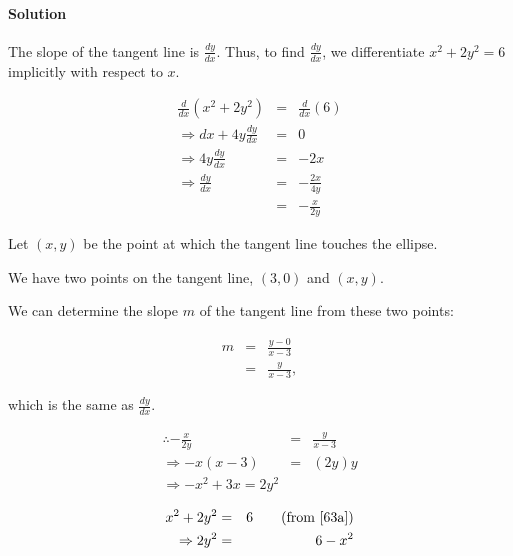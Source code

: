 

\paragraph{Solution} 

The slope of the tangent line is $\frac{dy}{dx}$. Thus, to find $\frac{dy}{dx}$, we differentiate $x^2+2y^2=6$ implicitly with respect to $x$.

\begin{eqnarray*}
	\frac{d}{dx}\left(x^2+2y^2\right)&=&\frac{d}{dx}\left(6\right)\\
	\Rightarrow dx+4y\frac{dy}{dx}&=&0\\
	\Rightarrow 4y\frac{dy}{dx}&=&-2x\\
	\Rightarrow \frac{dy}{dx}&=&-\frac{2x}{4y}\\
	&=&-\frac{x}{2y}
\end{eqnarray*}

Let $\left(x,y\right)$ be the point at which the tangent line touches the ellipse.

We have two points on the tangent line, $\left(3,0\right)$ and $\left(x,y\right)$.

We can determine the slope $m$ of the tangent line from these two points:

\begin{eqnarray*}
	m&=&\frac{y-0}{x-3}\\
	&=&\frac{y}{x-3},
\end{eqnarray*}

which is the same as $\frac{dy}{dx}$.

\begin{eqnarray}
	\therefore-\frac{x}{2y}&=&\frac{y}{x-3}\nonumber\\
	\Rightarrow-x\left(x-3\right)&=&\left(2y\right)y\nonumber\\
	\Rightarrow-x^2+3x=2y^2\label{63b}
\end{eqnarray}

\begin{eqnarray}
	x^2+2y^2&=&6\qquad\mbox{(from \ref{63a})}\nonumber\\
	\Rightarrow2y^2&=&6-x^2\label{63c}
\end{eqnarray}

